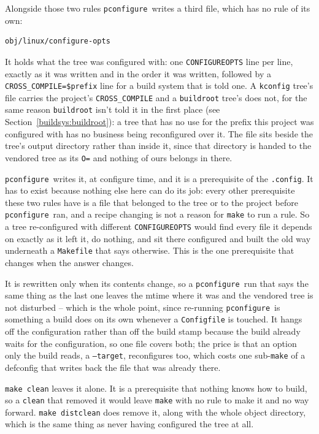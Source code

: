 \documentclass{article}
\newcommand{\pconfigure}{\texttt{pconfigure}}
\begin{document}
Alongside those two rules \pconfigure\ writes a third file, which has
no rule of its own:

\begin{verbatim}
obj/linux/configure-opts
\end{verbatim}

It holds what the tree was configured with: one
\texttt{CONFIGUREOPTS} line per line, exactly as it was written and in
the order it was written, followed by a
\texttt{CROSS\_COMPILE=\$prefix} line for a build system that is told
one.  A \texttt{kconfig} tree's file carries the project's
\texttt{CROSS\_COMPILE} and a \texttt{buildroot} tree's does not, for
the same reason \texttt{buildroot} isn't told it in the first place
(see Section~\ref{buildsys:buildroot}): a tree that has no use for the
prefix this project was configured with has no business being
reconfigured over it.  The file sits beside the tree's output
directory rather than inside it, since that directory is handed to the
vendored tree as its \texttt{O=} and nothing of ours belongs in there.

\pconfigure\ writes it, at configure time, and it is a prerequisite of
the \texttt{.config}.  It has to exist because nothing else here can
do its job: every other prerequisite these two rules have is a file
that belonged to the tree or to the project before \pconfigure\ ran,
and a recipe changing is not a reason for \texttt{make} to run a rule.
So a tree re-configured with different \texttt{CONFIGUREOPTS} would
find every file it depends on exactly as it left it, do nothing, and
sit there configured and built the old way underneath a
\texttt{Makefile} that says otherwise.  This is the one prerequisite
that changes when the answer changes.

It is rewritten only when its contents change, so a \pconfigure\ run
that says the same thing as the last one leaves the mtime where it was
and the vendored tree is not disturbed -- which is the whole point,
since re-running \pconfigure\ is something a build does on its own
whenever a \texttt{Configfile} is touched.  It hangs off the
configuration rather than off the build stamp because the build
already waits for the configuration, so one file covers both; the
price is that an option only the build reads, a \texttt{--target},
reconfigures too, which costs one sub-\texttt{make} of a defconfig
that writes back the file that was already there.

\texttt{make clean} leaves it alone.  It is a prerequisite that
nothing knows how to build, so a \texttt{clean} that removed it would
leave \texttt{make} with no rule to make it and no way forward.
\texttt{make distclean} does remove it, along with the whole object
directory, which is the same thing as never having configured the tree
at all.
\end{document}
